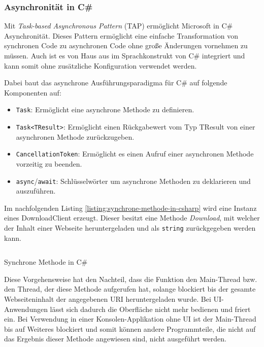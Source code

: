 \subsubsection{Asynchronität in C\#}
\label{subsubsec:ansynchronitaet-in-csharp}

Mit \textit{Task-based Asynchronous Pattern} (TAP) ermöglicht Microsoft in C\# Asynchronität. Dieses Pattern ermöglicht eine einfache Transformation von synchronen Code zu asynchronen Code ohne große Änderungen vornehmen zu müssen. Auch ist es von Haus aus im Sprachkonstrukt von C\# integriert und kann somit ohne zusätzliche Konfiguration verwendet werden.

Dabei baut das asynchrone Ausführungsparadigma für C\# auf folgende Komponenten auf:
\begin{itemize}
    \item \texttt{Task}: Ermöglicht eine asynchrone Methode zu definieren.
    \item \texttt{Task<TResult>}: Ermöglicht einen Rückgabewert vom Typ TResult von einer asynchronen Methode zurückzugeben.
    \item \texttt{CancellationToken}: Ermöglicht es einen Aufruf einer asynchronen Methode vorzeitig zu beenden.
    \item \texttt{async}/\texttt{await}: Schlüsselwörter um asynchrone Methoden zu deklarieren und auszuführen.
\end{itemize}

Im nachfolgenden Listing \ref{listing:synchrone-methode-in-csharp} wird eine Instanz eines DownloadClient erzeugt. Dieser besitzt eine Methode \textit{Download}, mit welcher der Inhalt einer Webseite heruntergeladen und als \texttt{string} zurückgegeben werden kann.

\begin{listing}[H]
    \inputminted[framesep=2mm, baselinestretch=1.2, fontsize=\normalsize, linenos]{csharp}{codes/example_synchronous.cs}
    \caption{Synchrone Methode in C\#}
    \label{listing:synchrone-methode-in-csharp}
\end{listing}

Diese Vorgehensweise hat den Nachteil, dass die Funktion den Main-Thread bzw. den Thread, der diese Methode aufgerufen hat, solange blockiert bis der gesamte Webseiteninhalt der angegebenen URI heruntergeladen wurde. Bei UI-Anwendungen lässt sich dadurch die Oberfläche nicht mehr bedienen und friert ein. Bei Verwendung in einer Konsolen-Applikation ohne UI ist der Main-Thread bis auf Weiteres blockiert und somit können andere Programmteile, die nicht auf das Ergebnis dieser Methode angewiesen sind, nicht ausgeführt werden.

